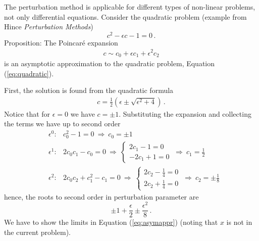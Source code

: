 \begin{example}
    The perturbation method is applicable for different types of non-linear
	problems, not only differential equations. Consider the quadratic problem 
	(example from Hince \textit{Perturbation Methods})
	\begin{equation}
 	 \label{eq:quadratic}
	  c^2 - \epsilon c -1 = 0 \, .
	\end{equation}
	Proposition: The Poincar\'{e} expansion
	\begin{eqnarray}
		c \sim c_0 + \epsilon c_1 + \epsilon^2c_2 
	\end{eqnarray}
	is an asymptotic approximation to the quadratic problem, Equation (\ref{eq:quadratic}).

	First, the solution is found from the quadratic formula
	\begin{eqnarray}
		\label{eq:solquadratic}
		c = \frac{1}{2} \left(\epsilon \pm \sqrt{\epsilon^2+4}\right) \, .
	\end{eqnarray}
	Notice that for $\epsilon = 0$	we have $c=\pm 1$. 
	Substituting the expansion and collecting the terms we have up to
	second order 
	\begin{eqnarray}
  	&\epsilon^0:& c_0^2 - 1 = 0 \ \Rightarrow \ c_0 = \pm 1 \\
  	&\epsilon^1:& 2 c_0c_1 - c_0= 0 \ \Rightarrow \ 
                \left\{
                \begin{matrix}
                  2c_1-1  = 0 \\
                  -2c_1 + 1 = 0
                \end{matrix}
  \right. \ \Rightarrow \ c_1 = \frac{1}{2} \\
  &\epsilon^2:& 2c_0c_2 + c_1^2-c_1 = 0
                \ \Rightarrow \ 
                \left\{
                \begin{matrix}
                  2c_2- \frac{1}{4}  = 0 \\
                  2c_2 + \frac{1}{4}= 0
                \end{matrix}
  \right. \ \Rightarrow \ c_2 = \pm \frac{1}{8} 
\end{eqnarray}
hence, the roots to second order in perturbation parameter are
	\begin{equation}
	  \pm 1 + \frac{\epsilon}{2} \pm \frac{\epsilon^2}{8} \, . 
	\end{equation}
	We have to show the limits in Equation (\ref{eq:asymappr}) (noting that $x$ is 
	not in the current problem). 


\end{example}
